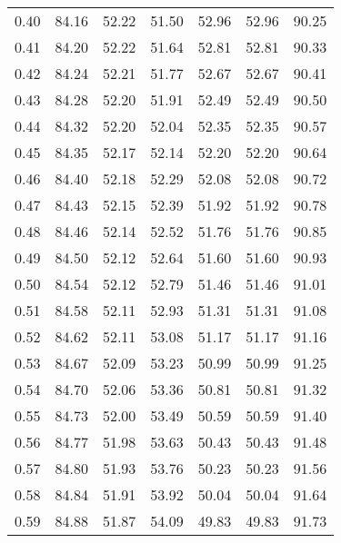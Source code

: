 \begin{tabular}{|c|c|c|c|c|c|c|}
      0.40 &     84.16 &     52.22 &      51.50 &   52.96 &      52.96 &         90.25 \\
      0.41 &     84.20 &     52.22 &      51.64 &   52.81 &      52.81 &         90.33 \\
      0.42 &     84.24 &     52.21 &      51.77 &   52.67 &      52.67 &         90.41 \\
      0.43 &     84.28 &     52.20 &      51.91 &   52.49 &      52.49 &         90.50 \\
      0.44 &     84.32 &     52.20 &      52.04 &   52.35 &      52.35 &         90.57 \\
      0.45 &     84.35 &     52.17 &      52.14 &   52.20 &      52.20 &         90.64 \\
      0.46 &     84.40 &     52.18 &      52.29 &   52.08 &      52.08 &         90.72 \\
      0.47 &     84.43 &     52.15 &      52.39 &   51.92 &      51.92 &         90.78 \\
      0.48 &     84.46 &     52.14 &      52.52 &   51.76 &      51.76 &         90.85 \\
      0.49 &     84.50 &     52.12 &      52.64 &   51.60 &      51.60 &         90.93 \\
      0.50 &     84.54 &     52.12 &      52.79 &   51.46 &      51.46 &         91.01 \\
      0.51 &     84.58 &     52.11 &      52.93 &   51.31 &      51.31 &         91.08 \\
      0.52 &     84.62 &     52.11 &      53.08 &   51.17 &      51.17 &         91.16 \\
      0.53 &     84.67 &     52.09 &      53.23 &   50.99 &      50.99 &         91.25 \\
      0.54 &     84.70 &     52.06 &      53.36 &   50.81 &      50.81 &         91.32 \\
      0.55 &     84.73 &     52.00 &      53.49 &   50.59 &      50.59 &         91.40 \\
      0.56 &     84.77 &     51.98 &      53.63 &   50.43 &      50.43 &         91.48 \\
      0.57 &     84.80 &     51.93 &      53.76 &   50.23 &      50.23 &         91.56 \\
      0.58 &     84.84 &     51.91 &      53.92 &   50.04 &      50.04 &         91.64 \\
      0.59 &     84.88 &     51.87 &      54.09 &   49.83 &      49.83 &         91.73 \\

\end{tabular}
